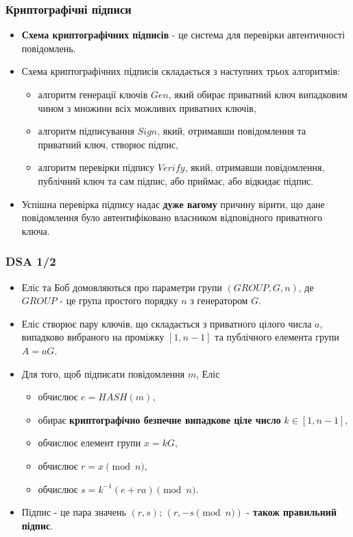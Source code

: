 \documentclass{beamer}
\begin{document}
\begin{frame}
  \frametitle{Криптографічні підписи}
  \begin{itemize}
  \item \textbf{Схема криптографічних підписів} - це система для перевірки
    автентичності повідомлень.
  \item Схема криптографічних підписів складається з наступних трьох алгоритмів:
    \begin{itemize}
    \item алгоритм генерації ключів $Gen$, який обирає приватний ключ випадковим
      чином з множини всіх можливих приватних ключів,
    \item алгоритм підписування $Sign$, який, отримавши повідомлення та
      приватний ключ, створює підпис,
    \item алгоритм перевірки підпису $Verify$, який, отримавши повідомлення,
      публічний ключ та сам підпис, або приймає, або відкидає підпис.
    \end{itemize}
  \item Успішна перевірка підпису надає \textbf{дуже вагому} причину вірити, що
    дане повідомлення було автентифіковано власником відповідного приватного
    ключа.
  \end{itemize}
\end{frame}

\begin{frame}
  \frametitle{DSA 1/2}
  \begin{itemize}
  \item Еліс та Боб домовляються про параметри групи $(GROUP, G, n)$, де
    $GROUP$ - це група простого порядку $n$ з генератором $G$.
  \item Еліс створює пару ключів, що складається з приватного цілого числа $a$,
    випадково вибраного на проміжку $[1, n - 1]$ та публічного елемента групи
    $A = aG$.
  \item Для того, щоб підписати повідомлення $m$, Еліс
    \begin{itemize}
    \item обчислює $e = HASH(m)$,
    \item обирає \textbf{криптографічно безпечне випадкове ціле число}
      $k \in [1, n - 1]$,
    \item обчислює елемент групи $x = kG$,
    \item обчислює $r = x \pmod{n}$,
    \item обчислює $s = k^{-1}(e + ra) \pmod{n}$.
    \end{itemize}
  \item Підпис - це пара значень $(r, s)$; $(r, -s \pmod{n})$ - \textbf{також
      правильний підпис}.
  \end{itemize}
\end{frame}
\end{document}
